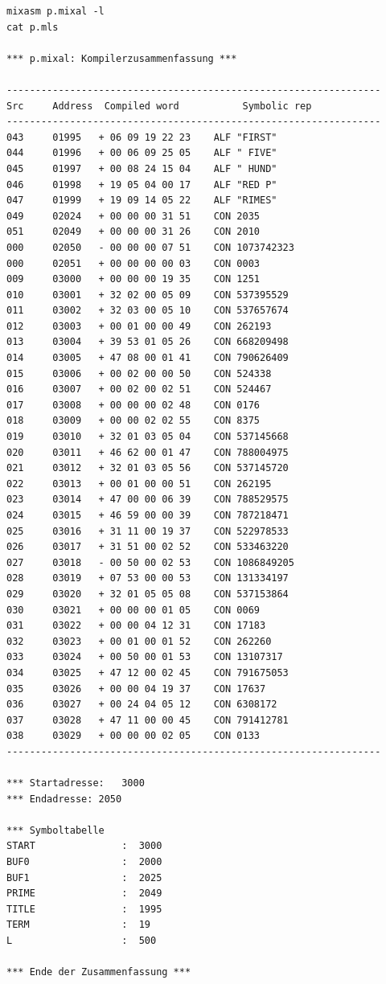 \documentclass[a4paper,ngerman]{scrartcl}
\begin{document}
\begin{lstlisting}
mixasm p.mixal -l
cat p.mls

*** p.mixal: Kompilerzusammenfassung ***

-----------------------------------------------------------------
Src     Address  Compiled word           Symbolic rep
-----------------------------------------------------------------
043     01995   + 06 09 19 22 23 	ALF	"FIRST"
044     01996   + 00 06 09 25 05 	ALF	" FIVE"
045     01997   + 00 08 24 15 04 	ALF	" HUND"
046     01998   + 19 05 04 00 17 	ALF	"RED P"
047     01999   + 19 09 14 05 22 	ALF	"RIMES"
049     02024   + 00 00 00 31 51 	CON	2035
051     02049   + 00 00 00 31 26 	CON	2010
000     02050   - 00 00 00 07 51 	CON	1073742323
000     02051   + 00 00 00 00 03 	CON	0003
009     03000   + 00 00 00 19 35 	CON	1251
010     03001   + 32 02 00 05 09 	CON	537395529
011     03002   + 32 03 00 05 10 	CON	537657674
012     03003   + 00 01 00 00 49 	CON	262193
013     03004   + 39 53 01 05 26 	CON	668209498
014     03005   + 47 08 00 01 41 	CON	790626409
015     03006   + 00 02 00 00 50 	CON	524338
016     03007   + 00 02 00 02 51 	CON	524467
017     03008   + 00 00 00 02 48 	CON	0176
018     03009   + 00 00 02 02 55 	CON	8375
019     03010   + 32 01 03 05 04 	CON	537145668
020     03011   + 46 62 00 01 47 	CON	788004975
021     03012   + 32 01 03 05 56 	CON	537145720
022     03013   + 00 01 00 00 51 	CON	262195
023     03014   + 47 00 00 06 39 	CON	788529575
024     03015   + 46 59 00 00 39 	CON	787218471
025     03016   + 31 11 00 19 37 	CON	522978533
026     03017   + 31 51 00 02 52 	CON	533463220
027     03018   - 00 50 00 02 53 	CON	1086849205
028     03019   + 07 53 00 00 53 	CON	131334197
029     03020   + 32 01 05 05 08 	CON	537153864
030     03021   + 00 00 00 01 05 	CON	0069
031     03022   + 00 00 04 12 31 	CON	17183
032     03023   + 00 01 00 01 52 	CON	262260
033     03024   + 00 50 00 01 53 	CON	13107317
034     03025   + 47 12 00 02 45 	CON	791675053
035     03026   + 00 00 04 19 37 	CON	17637
036     03027   + 00 24 04 05 12 	CON	6308172
037     03028   + 47 11 00 00 45 	CON	791412781
038     03029   + 00 00 00 02 05 	CON	0133
-----------------------------------------------------------------

*** Startadresse:	3000
*** Endadresse:	2050

*** Symboltabelle
START               :  3000
BUF0                :  2000
BUF1                :  2025
PRIME               :  2049
TITLE               :  1995
TERM                :  19
L                   :  500

*** Ende der Zusammenfassung ***

\end{lstlisting}
\end{document}
